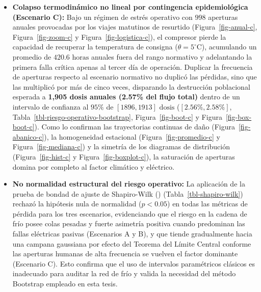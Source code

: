 \documentclass[
  spanish,
  letterpaper,
  DIV=11,
  numbers=noendperiod]{scrreprt}
\theoremstyle{plain}
\theoremstyle{plain}
\theoremstyle{plain}
\theoremstyle{definition}
\theoremstyle{remark}
\begin{document}
\begin{itemize}
  (Sección~\ref{sec-resultados-seguridad}), la convergencia asintótica
  de las \(5,000\) simulaciones demostró que el ingreso recurrente de
  calor humano termina por imponerse, elevando la merma poblacional
  esperada a \textbf{343 dosis anuales (1.36\% de pérdida relativa)} con
  un intervalo de confianza Bootstrap al \(95\%\) de
  \([340, 346]\text{ dosis}\) (\([1.34\%, 1.37\%]\),
  Figura~\ref{fig-abanico-b}, Figura~\ref{fig-hist-b},
  Figura~\ref{fig-boot-b} y Figura~\ref{fig-box-boot-b}), desplazando
  además el riesgo estacional hacia los meses de enero y agosto
  (Figura~\ref{fig-promedio-b} y Figura~\ref{fig-mediana-b}).
\item
  \textbf{Colapso termodinámico no lineal por contingencia
  epidemiológica (Escenario C):} Bajo un régimen de estrés operativo con
  \(998\) aperturas anuales provocadas por los viajes matutinos de
  resurtido (Figura~\ref{fig-anual-c}, Figura~\ref{fig-zoom-c} y
  Figura~\ref{fig-logistica-c}), el compresor pierde la capacidad de
  recuperar la temperatura de consigna (\(\theta = 5^\circ\text{C}\)),
  acumulando un promedio de \(420.6\text{ horas}\) anuales fuera del
  rango normativo y adelantando la primera falla crítica apenas al
  tercer día de operación. Duplicar la frecuencia de aperturas respecto
  al escenario normativo no duplicó las pérdidas, sino que las
  multiplicó por más de cinco veces, disparando la destrucción
  poblacional esperada a \textbf{1,905 dosis anuales (2.57\% del flujo
  total)} dentro de un intervalo de confianza al \(95\%\) de
  \([1896, 1913]\text{ dosis}\) (\([2.56\%, 2.58\%]\),
  Tabla~\ref{tbl-riesgo-operativo-bootstrap}, Figura~\ref{fig-boot-c} y
  Figura~\ref{fig-box-boot-c}). Como lo confirman las trayectorias
  continuas de daño (Figura~\ref{fig-abanico-c}), la homogeneidad
  estacional (Figura~\ref{fig-promedio-c} y Figura~\ref{fig-mediana-c})
  y la simetría de los diagramas de distribución
  (Figura~\ref{fig-hist-c} y Figura~\ref{fig-boxplot-c}), la saturación
  de aperturas domina por completo al factor climático y eléctrico.
\item
  \textbf{No normalidad estructural del riesgo operativo:} La aplicación
  de la prueba de bondad de ajuste de Shapiro-Wilk
  ()
  (Tabla~\ref{tbl-shapiro-wilk}) rechazó la hipótesis nula de normalidad
  (\(p < 0.05\)) en todas las métricas de pérdida para los tres
  escenarios, evidenciando que el riesgo en la cadena de frío posee
  colas pesadas y fuerte asimetría positiva cuando predominan las fallas
  eléctricas pasivas (Escenarios A y B), y que tiende gradualmente hacia
  una campana gaussiana por efecto del Teorema del Límite Central
  conforme las aperturas humanas de alta frecuencia se vuelven el factor
  dominante (Escenario C). Esto confirma que el uso de intervalos
  paramétricos clásicos es inadecuado para auditar la red de frío y
  valida la necesidad del método Bootstrap empleado en esta tesis.
\end{itemize}
\end{document}
